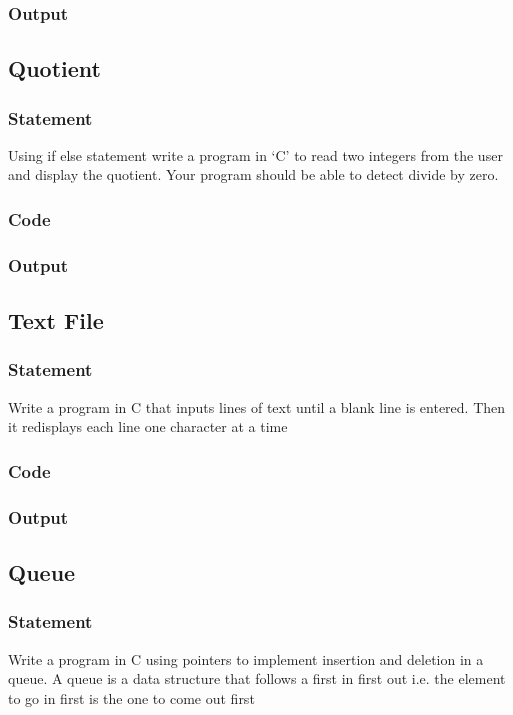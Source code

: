 \subsubsection{Output}

\pagebreak
\subsection{Quotient}
\subsubsection{Statement}
Using if else statement write a program in ‘C’ to read two integers from the user and display
the quotient. Your program should be able to detect divide by zero.
\subsubsection{Code}
\subsubsection{Output}

\pagebreak
\subsection{Text File}
\subsubsection{Statement}
Write a program in C that inputs lines of text until a blank line is entered. Then it redisplays
each line one character at a time
\subsubsection{Code}
\subsubsection{Output}

\pagebreak
\subsection{Queue}
\subsubsection{Statement}
Write a program in C using pointers to implement insertion and deletion in a queue. A queue
is a data structure that follows a first in first out i.e. the element to go in first is the one to come
out first
